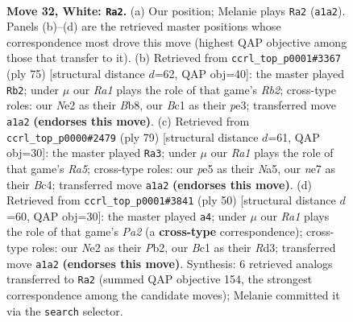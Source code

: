 \documentclass[11pt]{article}
\begin{document}
\clearpage

\begin{figure}[p]\centering
\begin{subfigure}{0.46\textwidth}\centering
\resizebox{\linewidth}{!}{%
\newchessgame
\chessboard[
  setfen={r2k4/b3n3/8/pp2p3/b1p3P1/P1P5/3NNP2/R1B1K3 w - - 0 32},
  showmover=false,
  pgfstyle=straightmove, color=movearrow, markmove={a1-a2}
]}
\caption{}
\end{subfigure}\hfill
\begin{subfigure}{0.46\textwidth}\centering
\resizebox{\linewidth}{!}{%
\newchessgame
\chessboard[
  setfen={1b6/1r3pk1/5npp/8/R1B1p1P1/4P2P/3N1PK1/8 b - - 3 38},
  showmover=false,
  pgfstyle=straightmove, color=movearrow, markmove={b7-b2}
]}
\caption{}
\end{subfigure}
\\[4pt]
\begin{subfigure}{0.46\textwidth}\centering
\resizebox{\linewidth}{!}{%
\newchessgame
\chessboard[
  setfen={5k2/1p2p1b1/3p1p2/n7/r1bNBP1B/2P1P3/6P1/2R3K1 b - - 8 40},
  showmover=false,
  pgfstyle=straightmove, color=movearrow, markmove={a4-a3}
]}
\caption{}
\end{subfigure}\hfill
\begin{subfigure}{0.46\textwidth}\centering
\resizebox{\linewidth}{!}{%
\newchessgame
\chessboard[
  setfen={4r1k1/1pp3b1/3pn1p1/p2N4/8/2PRB1PP/PP3K2/8 w - - 0 26},
  showmover=false,
  pgfstyle=straightmove, color=movearrow, markmove={a2-a4}
]}
\caption{}
\end{subfigure}
\caption{\textbf{Move 32, White: \texttt{Ra2}.} (a) Our position; Melanie plays \texttt{Ra2} (\texttt{a1a2}). Panels (b)--(d) are the retrieved master positions whose correspondence most drove this move (highest QAP objective among those that transfer to it). (b) Retrieved from \texttt{ccrl\_top\_p0001\#3367} (ply 75) [structural distance $d$=62, QAP obj=40]: the master played \texttt{Rb2}; under $\mu$ our \emph{Ra1} plays the role of that game's \emph{Rb2}; cross-type roles: our \emph{N}e2 as their \emph{B}b8, our \emph{B}c1 as their \emph{p}e3; transferred move \texttt{a1a2} \textbf{(endorses this move)}. (c) Retrieved from \texttt{ccrl\_top\_p0000\#2479} (ply 79) [structural distance $d$=61, QAP obj=30]: the master played \texttt{Ra3}; under $\mu$ our \emph{Ra1} plays the role of that game's \emph{Ra5}; cross-type roles: our \emph{p}e5 as their \emph{N}a5, our \emph{n}e7 as their \emph{B}c4; transferred move \texttt{a1a2} \textbf{(endorses this move)}. (d) Retrieved from \texttt{ccrl\_top\_p0001\#3841} (ply 50) [structural distance $d$=60, QAP obj=30]: the master played \texttt{a4}; under $\mu$ our \emph{Ra1} plays the role of that game's \emph{Pa2} (a \textbf{cross-type} correspondence); cross-type roles: our \emph{N}e2 as their \emph{P}b2, our \emph{B}c1 as their \emph{R}d3; transferred move \texttt{a1a2} \textbf{(endorses this move)}. Synthesis: 6 retrieved analogs transferred to \texttt{Ra2} (summed QAP objective 154, the strongest correspondence among the candidate moves); Melanie committed it via the \texttt{search} selector.}
\label{fig:thought-m62}
\end{figure}
\end{document}
